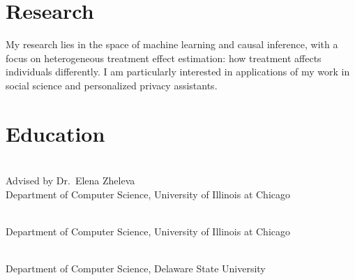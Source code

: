 \documentclass[mm]{simple_style}
\begin{document}
\begin{resume}

\section{Research}
\par
My research lies in the space of machine learning and causal inference, with a focus on heterogeneous treatment effect estimation: how treatment affects individuals differently. 
I am particularly interested in applications of my work in social science and personalized privacy assistants.

\vspace{-2ex}
\sectionline


\section{Education}
\\
Advised by Dr.\ Elena Zheleva
\\
Department of Computer Science, University of Illinois at Chicago 

\\
Department of Computer Science, University of Illinois at Chicago 

\\
Department of Computer Science, Delaware State University 


\end{resume}
\end{document}
